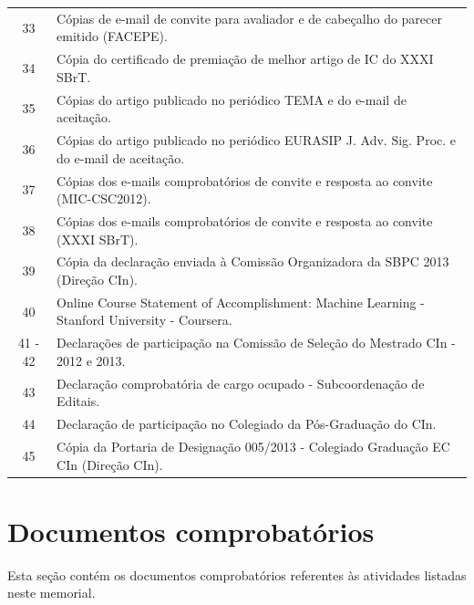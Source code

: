 \documentclass[a4paper,oneside,10pt]{article}
\newcounter{document}%
\begin{document}
\begin{table}[h]
\begin{tabular}{cl}
  \cmidrule{1-2}
  33 & C\'{o}pias de e-mail de convite para avaliador e de cabe\c{c}alho do parecer emitido (FACEPE). \\
  34 & C\'{o}pia do certificado de premia\c{c}\~{a}o de melhor artigo de IC do XXXI SBrT. \\
  35 & C\'{o}pias do artigo publicado no peri\'{o}dico TEMA e do e-mail de aceita\c{c}\~{a}o. \\
  36 & C\'{o}pias do artigo publicado no peri\'{o}dico EURASIP J. Adv. Sig. Proc. e do e-mail de aceita\c{c}\~{a}o. \\
  37 & C\'{o}pias dos e-mails comprobat\'{o}rios de convite e resposta ao convite (MIC-CSC2012). \\
  38 & C\'{o}pias dos e-mails comprobat\'{o}rios de convite e resposta ao convite (XXXI SBrT). \\
  39 & C\'{o}pia da declara\c{c}\~{a}o enviada \`{a} Comiss\~{a}o Organizadora da SBPC 2013 (Dire\c{c}\~{a}o CIn). \\
  40 & Online Course Statement of Accomplishment: Machine Learning - Stanford University - Coursera. \\
  41 - 42 & Declara\c{c}\~{o}es de participa\c{c}\~{a}o na Comiss\~{a}o de Sele\c{c}\~{a}o do Mestrado CIn - 2012 e 2013. \\
  43 & Declara\c{c}\~{a}o comprobat\'{o}ria de cargo ocupado - Subcoordena\c{c}\~{a}o de Editais. \\
  44 & Declara\c{c}\~{a}o de participa\c{c}\~{a}o no Colegiado da P\'{o}s-Gradua\c{c}\~{a}o do CIn. \\
  45 & C\'{o}pia da Portaria de Designa\c{c}\~{a}o 005/2013 - Colegiado Gradua\c{c}\~{a}o EC CIn (Dire\c{c}\~{a}o CIn). \\
\bottomrule
\end{tabular}
\label{Tab:ListaAnexos}
\end{table}

\clearpage
\appendix
\newpage
\section{Documentos comprobatórios}
Esta seção contém os documentos comprobatórios referentes às atividades listadas neste memorial.
\renewcommand{\thesubsection}{\arabic{subsection}}


\end{document}
